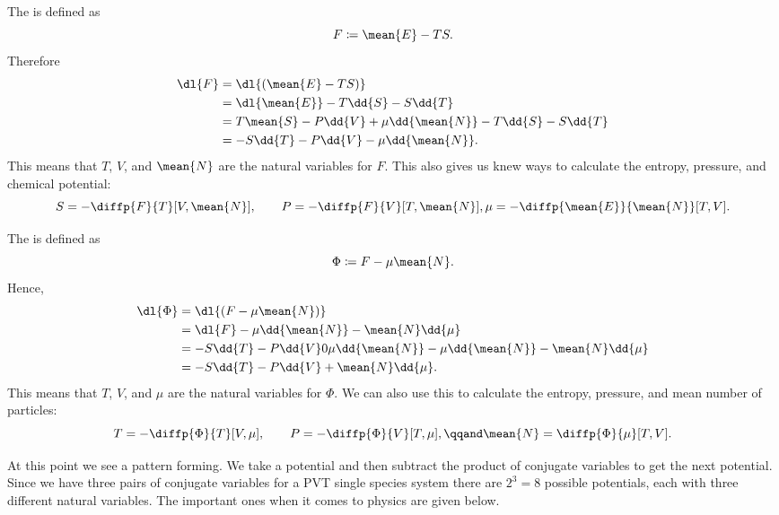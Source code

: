 \documentclass[fleqn]{NotesClass}
\begin{document}
    The  is defined as
    \begin{equation}
        F \coloneqq \mean{E} - TS.
    \end{equation}
    Therefore
    \begin{align}
        \dl{F} &= \dl{(\mean{E} - TS)}\\
        &= \dl{\mean{E}} - T\dd{S} - S\dd{T}\\
        &= T\mean{S} - P\dd{V} + \mu\dd{\mean{N}} - T\dd{S} - S\dd{T}\\
        &= -S\dd{T} - P\dd{V} - \mu\dd{\mean{N}}.
    \end{align}
    This means that \(T\), \(V\), and \(\mean{N}\) are the natural variables for \(F\).
    This also gives us knew ways to calculate the entropy, pressure, and chemical potential:
    \begin{equation}
        S = -\diffp{F}{T}[V, \mean{N}], \qquad P = -\diffp{F}{V}[T, \mean{N}], \mu = -\diffp{\mean{E}}{\mean{N}}[T, V].
    \end{equation}
    
    The  is defined as
    \begin{equation}
        \Phi \coloneqq F - \mu \mean{N}.
    \end{equation}
    Hence,
    \begin{align}
        \dl{\Phi} &= \dl{(F - \mu\mean{N})}\\
        &= \dl{F} - \mu\dd{\mean{N}} - \mean{N}\dd{\mu}\\
        &= -S\dd{T} - P\dd{V} 0 \mu\dd{\mean{N}} - \mu\dd{\mean{N}} - \mean{N}\dd{\mu}\\
        &= -S\dd{T} - P\dd{V} + \mean{N}\dd{\mu}.
    \end{align}
    This means that \(T\), \(V\), and \(\mu\) are the natural variables for \(\Phi\).
    We can also use this to calculate the entropy, pressure, and mean number of particles:
    \begin{equation}
        T = -\diffp{\Phi}{T}[V, \mu], \qquad P = -\diffp{\Phi}{V}[T, \mu], \qqand \mean{N} = \diffp{\Phi}{\mu}[T, V].
    \end{equation}
    
    At this point we see a pattern forming.
    We take a potential and then subtract the product of conjugate variables to get the next potential.
    Since we have three pairs of conjugate variables for a PVT single species system there are \(2^3 = 8\) possible potentials, each with three different natural variables.
    The important ones when it comes to physics are given below.
    
\end{document}
